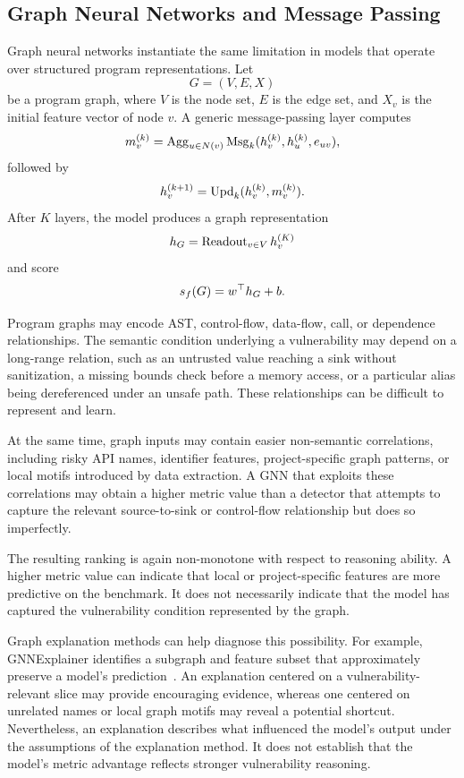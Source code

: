 \documentclass[acmsmall,screen,review,anonymous]{acmart}
\begin{document}
\subsection{Graph Neural Networks and Message Passing}
\label{sec:supp-gnn-instantiation}

Graph neural networks instantiate the same limitation in models that operate
over structured program representations. Let
\[
G=(V,E,X)
\]
be a program graph, where \(V\) is the node set, \(E\) is the edge set, and
\(X_v\) is the initial feature vector of node \(v\). A generic
message-passing layer computes
\[
m_v^{(k)}
=
\operatorname{Agg}_{u\in N(v)}
\operatorname{Msg}_k(h_v^{(k)},h_u^{(k)},e_{uv}),
\]
followed by
\[
h_v^{(k+1)}
=
\operatorname{Upd}_k(h_v^{(k)},m_v^{(k)}).
\]
After \(K\) layers, the model produces a graph representation
\[
h_G
=
\operatorname{Readout}_{v\in V}h_v^{(K)}
\]
and score
\[
s_{f}(G)=w^\top h_G+b.
\]

Program graphs may encode AST, control-flow, data-flow, call, or dependence
relationships. The semantic condition underlying a vulnerability may depend
on a long-range relation, such as an untrusted value reaching a sink without
sanitization, a missing bounds check before a memory access, or a particular
alias being dereferenced under an unsafe path. These relationships can be
difficult to represent and learn.

At the same time, graph inputs may contain easier non-semantic correlations,
including risky API names, identifier features, project-specific graph
patterns, or local motifs introduced by data extraction. A GNN that exploits
these correlations may obtain a higher metric value than a detector that
attempts to capture the relevant source-to-sink or control-flow relationship
but does so imperfectly.

The resulting ranking is again non-monotone with respect to reasoning
ability. A higher metric value can indicate that local or project-specific
features are more predictive on the benchmark. It does not necessarily
indicate that the model has captured the vulnerability condition represented
by the graph.

Graph explanation methods can help diagnose this possibility. For example,
GNNExplainer identifies a subgraph and feature subset that approximately
preserve a model's prediction~\cite{Ying2019GNNExplainer}. An explanation
centered on a vulnerability-relevant slice may provide encouraging evidence,
whereas one centered on unrelated names or local graph motifs may reveal a
potential shortcut. Nevertheless, an explanation describes what influenced
the model's output under the assumptions of the explanation method. It does
not establish that the model's metric advantage reflects stronger
vulnerability reasoning.
\end{document}

